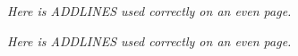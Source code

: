 \documentclass[twoside,twocolumn]{article}
\begin{document}
\lipsum[1-9]

\emph{Here is ADDLINES used correctly on an even page.}
\addline

\lipsum[1]
\addline*

\lipsum[2]

\lipsum[1-9]

\emph{Here is ADDLINES used correctly on an even page.}
\addline

\lipsum[1]
\addline*[-3]

\lipsum[2]

\lipsum[1-9]
\end{document}
